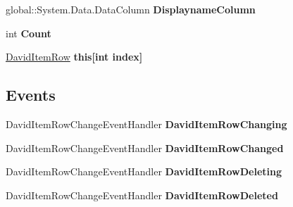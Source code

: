 \begin{DoxyCompactItemize}
\item 
global\+::\+System.\+Data.\+Data\+Column {\bfseries Displayname\+Column}\hypertarget{class_products_1_1_data_1_1ds_sage_1_1_david_item_data_table_ac30cb5468291626d6be3a103aecc17e8}{}\label{class_products_1_1_data_1_1ds_sage_1_1_david_item_data_table_ac30cb5468291626d6be3a103aecc17e8}

\item 
int {\bfseries Count}\hypertarget{class_products_1_1_data_1_1ds_sage_1_1_david_item_data_table_ae013dd240cdcbf38c91abdd369c4fd2d}{}\label{class_products_1_1_data_1_1ds_sage_1_1_david_item_data_table_ae013dd240cdcbf38c91abdd369c4fd2d}

\item 
\hyperlink{class_products_1_1_data_1_1ds_sage_1_1_david_item_row}{David\+Item\+Row} {\bfseries this\mbox{[}int index\mbox{]}}\hypertarget{class_products_1_1_data_1_1ds_sage_1_1_david_item_data_table_a9a15ffe4f1b84a4127f48705c9791f39}{}\label{class_products_1_1_data_1_1ds_sage_1_1_david_item_data_table_a9a15ffe4f1b84a4127f48705c9791f39}

\end{DoxyCompactItemize}
\subsection*{Events}
\begin{DoxyCompactItemize}
\item 
David\+Item\+Row\+Change\+Event\+Handler {\bfseries David\+Item\+Row\+Changing}\hypertarget{class_products_1_1_data_1_1ds_sage_1_1_david_item_data_table_a894be247e531dcaac229d7e3301ca3d7}{}\label{class_products_1_1_data_1_1ds_sage_1_1_david_item_data_table_a894be247e531dcaac229d7e3301ca3d7}

\item 
David\+Item\+Row\+Change\+Event\+Handler {\bfseries David\+Item\+Row\+Changed}\hypertarget{class_products_1_1_data_1_1ds_sage_1_1_david_item_data_table_a33e93fc330aa69cc6b9804d3a55548e8}{}\label{class_products_1_1_data_1_1ds_sage_1_1_david_item_data_table_a33e93fc330aa69cc6b9804d3a55548e8}

\item 
David\+Item\+Row\+Change\+Event\+Handler {\bfseries David\+Item\+Row\+Deleting}\hypertarget{class_products_1_1_data_1_1ds_sage_1_1_david_item_data_table_abde6945c6ee392be05de06620c2be569}{}\label{class_products_1_1_data_1_1ds_sage_1_1_david_item_data_table_abde6945c6ee392be05de06620c2be569}

\item 
David\+Item\+Row\+Change\+Event\+Handler {\bfseries David\+Item\+Row\+Deleted}\hypertarget{class_products_1_1_data_1_1ds_sage_1_1_david_item_data_table_ac931d4e3ccef17a4f34a171a2201c8a3}{}\label{class_products_1_1_data_1_1ds_sage_1_1_david_item_data_table_ac931d4e3ccef17a4f34a171a2201c8a3}

\end{DoxyCompactItemize}


